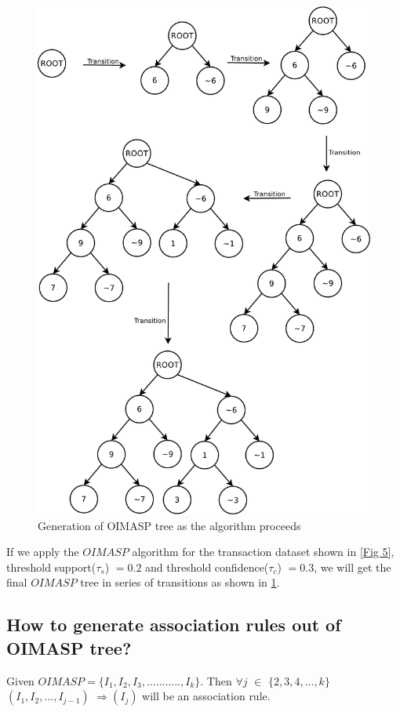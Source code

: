 \documentclass[review]{elsarticle}
\begin{document}
\begin{figure}
\begin{center}
\includegraphics[scale=0.3]{pdf/transition}
\end{center}
\caption{Generation of OIMASP tree as the algorithm proceeds}
\label{Fig 6}
\end{figure}

If we apply the $ OIMASP $ algorithm for the transaction dataset shown in \ref{Fig 5}, threshold support($ \tau _{s} $) $ = 0.2 $ and threshold confidence($ \tau _{c} $) $ = 0.3 $, we will get the final $ OIMASP $ tree in series of transitions as shown in \ref{Fig 6}.

\subsection{How to generate association rules out of OIMASP tree?}
\begin{rmk}
	Given $ OIMASP = \{I_{1}, I_{2}, I_{3}, ..........., I_{k}\} $. Then $ \forall j $ $ \in $ $ \lbrace 2, 3, 4, 		..., k \rbrace $ $ (I_{1}, I_{2}, ..., I_{j-1})$ $ \Rightarrow (I_{j}) $ will be an association rule.		
\end{rmk}
\end{document}
